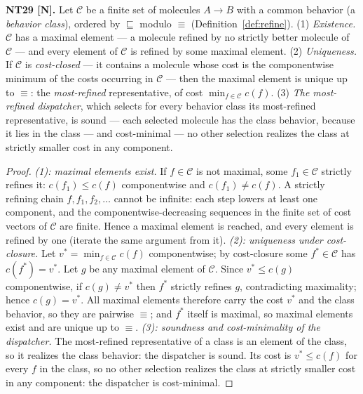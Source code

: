 \begin{theorem}\label{nt:29}
\textbf{NT29 [N].} Let $\mathcal{C}$ be a finite set of molecules
$A \to B$ with a common behavior (a \emph{behavior class}), ordered by
$\sqsubseteq$ modulo $\equiv$ (Definition~\ref{def:refine}).
(1) \emph{Existence.} $\mathcal{C}$ has a maximal element --- a molecule
refined by no strictly better molecule of $\mathcal{C}$ --- and every element
of $\mathcal{C}$ is refined by some maximal element.
(2) \emph{Uniqueness.} If $\mathcal{C}$ is \emph{cost-closed} --- it contains
a molecule whose cost is the componentwise minimum of the costs occurring in
$\mathcal{C}$ --- then the maximal element is unique up to $\equiv$: the
\emph{most-refined} representative, of cost $\min_{f \in \mathcal{C}} c(f)$.
(3) \emph{The most-refined dispatcher}, which selects for every behavior class
its most-refined representative, is sound --- each selected molecule has the
class behavior, because it lies in the class --- and cost-minimal --- no other
selection realizes the class at strictly smaller cost in any component.
\end{theorem}

\begin{proof}
\emph{(1): maximal elements exist.} If $f \in \mathcal{C}$ is not maximal, some
$f_1 \in \mathcal{C}$ strictly refines it: $c(f_1) \le c(f)$ componentwise and
$c(f_1) \neq c(f)$. A strictly refining chain
$f, f_1, f_2, \dots$ cannot be infinite: each step lowers at least one
component, and the componentwise-decreasing sequences in the finite set of
cost vectors of $\mathcal{C}$ are finite. Hence a maximal element is reached,
and every element is refined by one (iterate the same argument from it).
\emph{(2): uniqueness under cost-closure.} Let
$v^{*} = \min_{f \in \mathcal{C}} c(f)$ componentwise; by cost-closure some
$f^{*} \in \mathcal{C}$ has $c(f^{*}) = v^{*}$. Let $g$ be any maximal element
of $\mathcal{C}$. Since $v^{*} \le c(g)$ componentwise, if $c(g) \neq v^{*}$
then $f^{*}$ strictly refines $g$, contradicting maximality; hence
$c(g) = v^{*}$. All maximal elements therefore carry the cost $v^{*}$ and the
class behavior, so they are pairwise $\equiv$; and $f^{*}$ itself is maximal,
so maximal elements exist and are unique up to $\equiv$.
\emph{(3): soundness and cost-minimality of the dispatcher.} The most-refined
representative of a class is an element of the class, so it realizes the class
behavior: the dispatcher is sound. Its cost is $v^{*} \le c(f)$ for every
$f$ in the class, so no other selection realizes the class at strictly
smaller cost in any component: the dispatcher is cost-minimal.
\end{proof}

